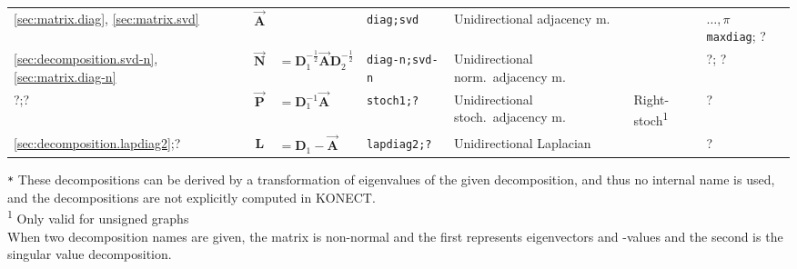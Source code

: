 \documentclass{article}
\begin{document}
\begin{table}
{{\begin{tabular}{ l c@{\;}l l l l l }
    \midrule \midrule
    
    \ref{sec:matrix.diag}, \ref{sec:matrix.svd} & $\vec{\mathbf A}$ && \texttt{diag;svd} & Unidirectional adjacency m. &
    &  $\ldots, \pi$ \texttt{maxdiag}; ? \\
    \ref{sec:decomposition.svd-n}, \ref{sec:matrix.diag-n} & $\vec{\mathbf N}$&$=\mathbf D_1^{-\frac 12}\vec{\mathbf A}\mathbf D_2^{-\frac 12}$ & \texttt{diag-n;svd-n} & Unidirectional norm.\ adjacency m. &
    & ?; ?  \\
    ?;? & $\vec{\mathbf P}$&$ = \mathbf D_1^{-1}\vec{\mathbf A}$ & \texttt{stoch1;?} & Unidirectional stoch.\ adjacency m. &
    Right-stoch\textsuperscript{1} 	& ? \\

    \midrule

    \ref{sec:decomposition.lapdiag2};? & $\mathbf L$&$ = \mathbf D_1 - \vec{\mathbf A}$ & \texttt{lapdiag2;?} & Unidirectional Laplacian &
    & ? \\ 

    \bottomrule
  \end{tabular}
    }
  }
  \texttt{*} These decompositions can be derived by a transformation of eigenvalues of the given decomposition, and thus no internal name is used, and the decompositions are not explicitly computed in KONECT.  \\ 
  \textsuperscript{1} Only valid for unsigned graphs \\
  When two decomposition names are given, the matrix is non-normal and
  the first represents eigenvectors and -values and the second is the
  singular value decomposition.
\end{table}
\end{document}
